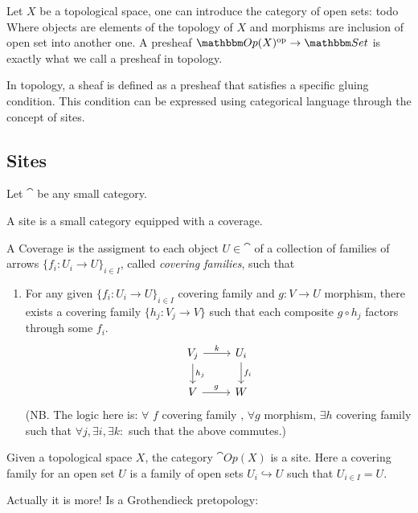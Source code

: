 \documentclass[a4paper,11pt]{article}  %
\begin{document}
\begin{example}\label{ex:topolo-presheaf}
Let $X$ be a topological space, one can introduce the category of open sets:
%
	{todo}
%
Where objects are elements of the topology of $X$ and morphisms are inclusion of open set into another one.
A presheaf $\cat[Op](X)^\op \to \Set$ is exactly what we call a presheaf in topology.
\end{example}
In topology, a sheaf is defined as a presheaf that satisfies a specific gluing condition. This condition can be expressed using categorical language through the concept of sites.


\subsection{Sites}
%
Let $\cat$ be any small category.

\begin{definition}[Site]
	A site is a small category equipped with a coverage.
\end{definition}

\begin{definition}[Coverage]
	A Coverage is the assigment to each object $U \in \cat$ of a collection of families of arrows $\{f_i:U_i\to U\}_{i\in I}$, called \emph{covering families}, such that
\begin{enumerate}
	\item For any given $\{f_i:U_i\to U\}_{i\in I}$ covering family and $g:V\to U$ morphism, there exists a covering family $\{h_j:V_j\to V\}$ such that each composite $g \circ h_j$ factors through some $f_i$.
	\begin{displaymath}
		\begin{tikzcd}
		V_j \ar[r,"k"] \ar[d,"h_j"] & U_i \ar[d,"f_i"] \\
		V \ar[r,"g"] & W
		\end{tikzcd}
	\end{displaymath}
	(NB. The logic here is: $\forall$ $f$ covering family , $\forall g$ morphism, $\exists h$ covering family such that $ \forall j, \exists i, \exists k \colon$ such that the above commutes.)
\end{enumerate}
\end{definition}

\begin{example}
	Given a topological space $X$, the category $\cat{Op}(X)$ is a site.
	Here a covering family for an open set $U$ is a family of open sets $U_i \hookrightarrow U$ such that $U_{i\in I} = U$. 
\end{example}
Actually it is more! Is a Grothendieck pretopology:
\end{document}

